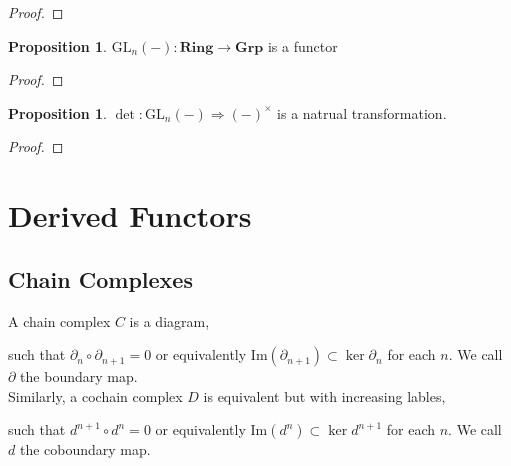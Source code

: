 \documentclass[12pt]{article}
\renewcommand{\Im}[1]{\mathrm{Im}(#1)}
\newcommand{\GL}[2]{\mathrm{GL}_{#1}(#2)}
\newcommand{\Grp}{\mathbf{Grp}}
\newcommand{\Ring}{\mathbf{Ring}}
\theoremstyle{remark}
\theoremstyle{definition}
\newtheorem{proposition}[theorem]{Proposition}
\newenvironment{definition}[1][Definition:]{\begin{trivlist}
\item[\hskip \labelsep {\bfseries #1}]}{\end{trivlist}}
\begin{document}
\begin{proof}

\end{proof}

\begin{proposition}
$\GL{n}{-} : \Ring \to \Grp$ is a functor
\end{proposition}

\begin{proof}

\end{proof}

\begin{proposition}
$\det : \GL{n}{-} \Longrightarrow (-)^\times$ is a natrual transformation. 
\end{proposition}

\begin{proof}

\end{proof}


\section{Derived Functors}

\subsection{Chain Complexes}

\newcommand{\Ch}[1]{\mathbf{Ch}\left( #1 \right)}

\begin{definition}
A chain complex $C$ is a diagram,
\begin{center}
\end{center}
such that $\partial_{n} \circ \partial_{n+1} = 0$ or equivalently $\Im{\partial_{n+1}} \subset \ker{\partial_{n}}$ for each $n$. We call $\partial$ the boundary map.
\bigskip\\
Similarly, a cochain complex $D$ is equivalent but with increasing lables, 
\begin{center}
\end{center}
such that $d^{n+1} \circ d^{n} = 0$ or equivalently $\Im{d^n} \subset \ker{d^{n+1}}$ for each $n$. We call $d$ the coboundary map.
\end{definition}
\end{document}
